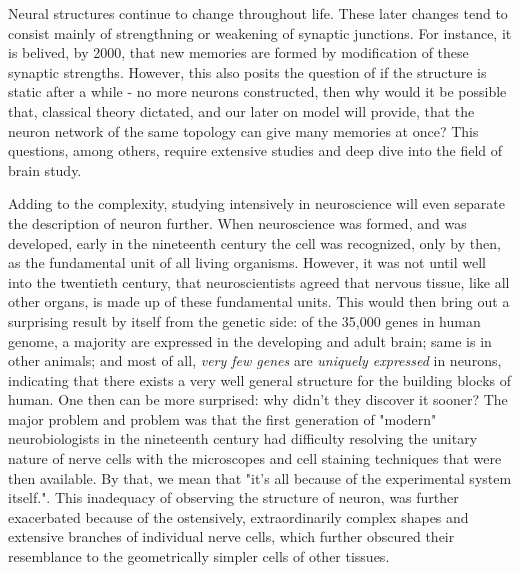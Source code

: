 Neural structures continue to change throughout life. These later changes tend to consist mainly of strengthning or weakening of synaptic junctions. For instance, it is belived, by 2000, that new memories are formed by modification of these synaptic strengths. However, this also posits the question of if the structure is static after a while - no more neurons constructed, then why would it be possible that, classical theory dictated, and our later on model will provide, that the neuron network of the same topology can give many memories at once? This questions, among others, require extensive studies and deep dive into the field of brain study. 

Adding to the complexity, studying intensively in neuroscience will even separate the description of neuron further. When neuroscience was formed, and was developed, early in the nineteenth century the cell was recognized, only by then, as the fundamental unit of all living organisms. However, it was not until well into the twentieth century, that neuroscientists agreed that nervous tissue, like all other organs, is made up of these fundamental units. This would then bring out a surprising result by itself from the genetic side: of the 35,000 genes in human genome, a majority are expressed in the developing and adult brain; same is in other animals; and most of all, \textit{very few genes} are \textit{uniquely expressed} in neurons, indicating that there exists a very well general structure for the building blocks of human. One then can be more surprised: why didn't they discover it sooner? The major problem and problem was that the first generation of "modern" neurobiologists in the nineteenth century had difficulty resolving the unitary nature of nerve cells with the microscopes and cell staining techniques that were then available. By that, we mean that "it's all because of the experimental system itself.". This inadequacy of observing the structure of neuron, was further exacerbated because of the ostensively, extraordinarily complex shapes and extensive branches of individual nerve cells, which further obscured their resemblance to the geometrically simpler cells of other tissues. 

